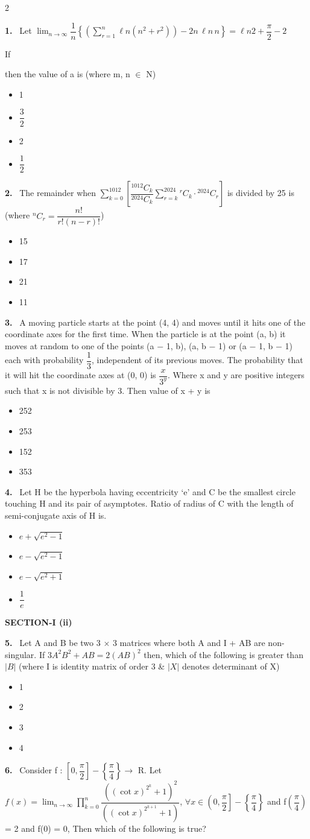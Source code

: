 \documentclass[10pt]{extarticle}
\newcommand{\sect}[1]{\par\smallskip\noindent\textbf{#1}\par}
\newcommand{\qn}[1]{\par\smallskip\noindent\textbf{#1.}~}
\newenvironment{qoptions}{\begin{itemize}[leftmargin=1.8em,itemsep=1pt,topsep=2pt,label={}]}{\end{itemize}}
\newcommand{\opt}[2]{\item[(#1)] #2}
\begin{document}
\begin{multicols}{2}
\qn{1} Let $\displaystyle\lim_{n\to\infty}\dfrac1n\left\{\left(\sum_{r=1}^n\ell n\left(n^2+r^2\right)\right)-2n\,\ell n\,n\right\}=\ell n2+\dfrac\pi2-2$\par
If\par{}\par then the value of a is (where m, n $\in$ N)
\begin{qoptions}
\opt{A}{1}
\opt{B}{$\dfrac32$}
\opt{C}{2}
\opt{D}{$\dfrac12$}
\end{qoptions}
\qn{2} The remainder when $\displaystyle\sum_{k=0}^{1012}\left[\dfrac{{}^{1012}C_k}{{}^{2024}C_k}\sum_{r=k}^{2024}{}^rC_k\cdot{}^{2024}C_r\right]$ is divided by 25 is (where ${}^nC_r=\dfrac{n!}{r!(n-r)!}$)
\begin{qoptions}
\opt{A}{15}
\opt{B}{17}
\opt{C}{21}
\opt{D}{11}
\end{qoptions}
\qn{3} A moving particle starts at the point (4, 4) and moves until it hits one of the coordinate axes for the first time. When the particle is at the point (a, b) it moves at random to one of the points (a $-$ 1, b), (a, b $-$ 1) or (a $-$ 1, b $-$ 1) each with probability $\dfrac13$, independent of its previous moves. The probability that it will hit the coordinate axes at (0, 0) is $\dfrac{x}{3^y}$. Where x and y are positive integers such that x is not divisible by 3. Then value of x + y is
\begin{qoptions}
\opt{A}{252}
\opt{B}{253}
\opt{C}{152}
\opt{D}{353}
\end{qoptions}
\qn{4} Let H be the hyperbola having eccentricity `e' and C be the smallest circle touching H and its pair of asymptotes. Ratio of radius of C with the length of semi-conjugate axis of H is.
\begin{qoptions}
\opt{A}{$e+\sqrt{e^2-1}$}
\opt{B}{$e-\sqrt{e^2-1}$}
\opt{C}{$e-\sqrt{e^2+1}$}
\opt{D}{$\dfrac1e$}
\end{qoptions}
\sect{SECTION-I (ii)}
\qn{5} Let A and B be two 3 $\times$ 3 matrices where both A and I + AB are non-singular. If $3A^2B^2+AB=2(AB)^2$ then, which of the following is greater than $|B|$ (where I is identity matrix of order 3 \& $|X|$ denotes determinant of X)
\begin{qoptions}
\opt{A}{1}
\opt{B}{2}
\opt{C}{3}
\opt{D}{4}
\end{qoptions}
\qn{6} Consider f : $\left[0,\dfrac\pi2\right]-\left\{\dfrac\pi4\right\}\rightarrow$ R. Let $f(x)=\displaystyle\lim_{n\to\infty}\prod_{k=0}^n\dfrac{\left((\cot x)^{2^k}+1\right)^2}{\left((\cot x)^{2^{k+1}}+1\right)}$, $\forall x\in\left(0,\dfrac\pi2\right]-\left\{\dfrac\pi4\right\}$ and f$\left(\dfrac\pi4\right)$ = 2 and f(0) = 0, Then which of the following is true?

\end{multicols}
\end{document}
